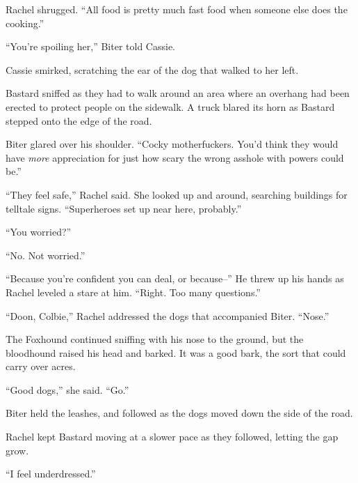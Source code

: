 Rachel shrugged.  ``All food is pretty much fast food when someone else does the cooking.''



``You're spoiling her,'' Biter told Cassie.



Cassie smirked, scratching the ear of the dog that walked to her left.



Bastard sniffed as they had to walk around an area where an overhang had been erected to protect people on the sidewalk.  A truck blared its horn as Bastard stepped onto the edge of the road.



Biter glared over his shoulder.  ``Cocky motherfuckers.  You'd think they would have \emph{more} appreciation for just how scary the wrong asshole with powers could be.''



``They feel safe,'' Rachel said.  She looked up and around, searching buildings for telltale signs.  ``Superheroes set up near here, probably.''



``You worried?''



``No.  Not worried.''



``Because you're confident you can deal, or because--''  He threw up his hands as Rachel leveled a stare at him.  ``Right.  Too many questions.''



``Doon, Colbie,'' Rachel addressed the dogs that accompanied Biter.  ``Nose.''



The Foxhound continued sniffing with his nose to the ground, but the bloodhound raised his head and barked.  It was a good bark, the sort that could carry over acres.



``Good dogs,'' she said.  ``Go.''



Biter held the leashes, and followed as the dogs moved down the side of the road.



Rachel kept Bastard moving at a slower pace as they followed, letting the gap grow.



``I feel underdressed.''



